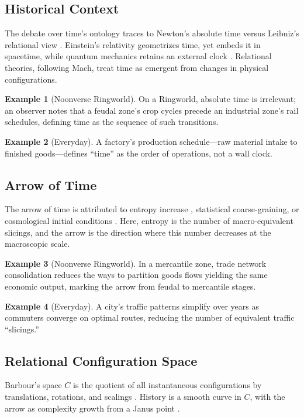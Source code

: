 \documentclass[11pt]{article}
\theoremstyle{plain}
\theoremstyle{definition}
\newtheorem{example}{Example}[section]
\begin{document}
\subsection{Historical Context}
The debate over time’s ontology traces to Newton’s absolute time versus Leibniz’s relational view \citep{Barbour1999}. Einstein’s relativity geometrizes time, yet embeds it in spacetime, while quantum mechanics retains an external clock \citep{Rovelli2015}. Relational theories, following Mach, treat time as emergent from changes in physical configurations.

\begin{example}[Noonverse Ringworld]
On a Ringworld, absolute time is irrelevant; an observer notes that a feudal zone’s crop cycles precede an industrial zone’s rail schedules, defining time as the sequence of such transitions.
\end{example}

\begin{example}[Everyday]
A factory’s production schedule—raw material intake to finished goods—defines “time” as the order of operations, not a wall clock.
\end{example}

\subsection{Arrow of Time}
The arrow of time is attributed to entropy increase \citep{Jaynes1957}, statistical coarse-graining, or cosmological initial conditions \citep{Ellis2012}. Here, entropy is the number of macro-equivalent slicings, and the arrow is the direction where this number decreases at the macroscopic scale.

\begin{example}[Noonverse Ringworld]
In a mercantile zone, trade network consolidation reduces the ways to partition goods flows yielding the same economic output, marking the arrow from feudal to mercantile stages.
\end{example}

\begin{example}[Everyday]
A city’s traffic patterns simplify over years as commuters converge on optimal routes, reducing the number of equivalent traffic “slicings.”
\end{example}

\subsection{Relational Configuration Space}
Barbour’s space $C$ is the quotient of all instantaneous configurations by translations, rotations, and scalings \citep{Barbour1999}. History is a smooth curve in $C$, with the arrow as complexity growth from a Janus point \citep{Barbour2014}.
\end{document}

